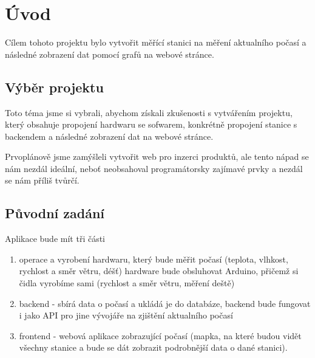 \section{Úvod}
Cílem tohoto projektu bylo vytvořit měřící stanici na měření aktualního počasí a následné zobrazení dat pomocí grafů na webové stránce.

\subsection{Výběr projektu}
Toto téma jsme si vybrali, abychom získali zkušenosti s vytvářením projektu, 
který obsahuje propojení hardwaru se sofwarem, konkrétně propojení stanice s backendem a následné zobrazení dat na webové stránce. 

Prvoplánově jsme zamýšleli vytvořit web pro inzerci produktů,
ale tento nápad se nám nezdál ideální, neboť neobsahoval programátorsky zajímavé prvky a nezdál se nám příliš tvůrčí.

\subsection{Původní zadání}
Aplikace bude mít tři části
\begin{enumerate}
    \item operace a vyrobení hardwaru, který bude měřit počasí (teplota, vlhkost, rychlost a směr větru, déšť) hardware bude obsluhovat Arduino, přičemž si čidla vyrobíme sami (rychlost a směr větru, měření deště)
    \item backend - sbírá data o počasí a ukládá je do databáze, backend bude fungovat i jako API pro jine vývojáře na zjištění aktualního počasí
    \item frontend - webová aplikace zobrazující počasí (mapka, na které budou vidět všechny stanice a bude se dát zobrazit podrobnější data o dané stanici).
\end{enumerate}